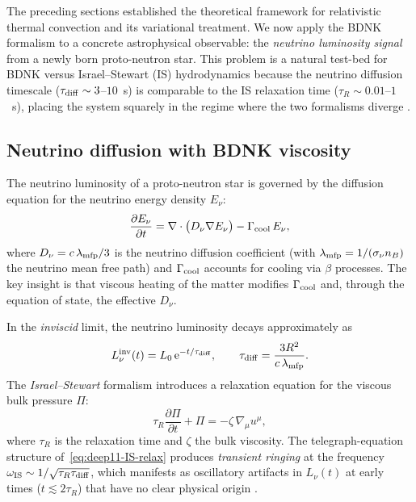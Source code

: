 The preceding sections established the theoretical framework for
relativistic thermal convection and its variational treatment.  We now
apply the BDNK formalism to a concrete astrophysical observable: the
\emph{neutrino luminosity signal} from a newly born proto-neutron star.
This problem is a natural test-bed for BDNK versus Israel--Stewart (IS)
hydrodynamics because the neutrino diffusion timescale ($\tau_{\rm diff}
\sim 3$--$10$~s) is comparable to the IS relaxation time ($\tau_R \sim
0.01$--$1$~s), placing the system squarely in the regime where the two
formalisms diverge \cite{NSevolutionBDNK2025}.

\subsection{Neutrino diffusion with BDNK viscosity}

The neutrino luminosity of a proto-neutron star is governed by the
diffusion equation for the neutrino energy density $E_\nu$:
\begin{equation}\label{eq:deep11-nu-diffusion}
  \frac{\partial E_\nu}{\partial t}
  = \nabla \cdot \bigl(D_\nu \nabla E_\nu\bigr)
  - \Gamma_{\rm cool}\, E_\nu,
\end{equation}
where $D_\nu = c\,\lambda_{\rm mfp}/3$ is the neutrino diffusion
coefficient (with $\lambda_{\rm mfp} = 1/(\sigma_\nu n_B)$ the neutrino
mean free path) and $\Gamma_{\rm cool}$ accounts for cooling via $\beta$
processes.  The key insight is that viscous heating of the matter modifies
$\Gamma_{\rm cool}$ and, through the equation of state, the effective
$D_\nu$.

In the \emph{inviscid} limit, the neutrino luminosity decays
approximately as
\begin{equation}\label{eq:deep11-L-inviscid}
  L_\nu^{\rm inv}(t) = L_0 \,\mathrm{e}^{-t/\tau_{\rm diff}},
  \qquad
  \tau_{\rm diff} = \frac{3R^{2}}{c\,\lambda_{\rm mfp}}.
\end{equation}
The \emph{Israel--Stewart} formalism introduces a relaxation equation for
the viscous bulk pressure $\Pi$:
\begin{equation}\label{eq:deep11-IS-relax}
  \tau_R \frac{\partial \Pi}{\partial t} + \Pi
  = -\zeta\,\nabla_\mu u^\mu,
\end{equation}
where $\tau_R$ is the relaxation time and $\zeta$ the bulk viscosity.
The telegraph-equation structure of~\eqref{eq:deep11-IS-relax} produces
\emph{transient ringing} at the frequency $\omega_{\rm IS} \sim
1/\sqrt{\tau_R \tau_{\rm diff}}$, which manifests as oscillatory
artifacts in $L_\nu(t)$ at early times ($t \lesssim 2\tau_R$) that have
no clear physical origin \cite{DR11_NSradialBDNK2025}.

